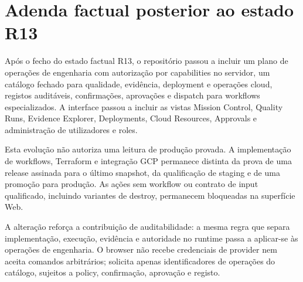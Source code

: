 \section*{Adenda factual posterior ao estado R13}

Após o fecho do estado factual R13, o repositório passou a incluir um plano de operações de engenharia com autorização por capabilities no servidor, um catálogo fechado para qualidade, evidência, deployment e operações cloud, registos auditáveis, confirmações, aprovações e dispatch para workflows especializados. A interface passou a incluir as vistas Mission Control, Quality Runs, Evidence Explorer, Deployments, Cloud Resources, Approvals e administração de utilizadores e roles.

Esta evolução não autoriza uma leitura de produção provada. A implementação de workflows, Terraform e integração GCP permanece distinta da prova de uma release assinada para o último snapshot, da qualificação de staging e de uma promoção para produção. As ações sem workflow ou contrato de input qualificado, incluindo variantes de destroy, permanecem bloqueadas na superfície Web.

A alteração reforça a contribuição de auditabilidade: a mesma regra que separa implementação, execução, evidência e autoridade no runtime passa a aplicar-se às operações de engenharia. O browser não recebe credenciais de provider nem aceita comandos arbitrários; solicita apenas identificadores de operações do catálogo, sujeitos a policy, confirmação, aprovação e registo.
